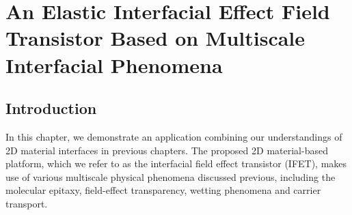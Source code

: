 \chapter[Elastic Interfacial Effect Field Transistor]{An Elastic Interfacial Effect Field Transistor Based on Multiscale Interfacial Phenomena}
\label{ch:small}
\renewcommand*\imgdir{img/small/}


\vspace{1em}



\section{Introduction}
\label{sec:small-introduction}

In this chapter, we demonstrate an application combining our
understandings of 2D material interfaces in previous chapters.  The
proposed 2D material-based platform, which we refer to as the
interfacial field effect transistor (IFET), makes use of various
multiscale physical phenomena discussed previous, including the
molecular epitaxy, field-effect transparency, wetting phenomena and
carrier transport.

